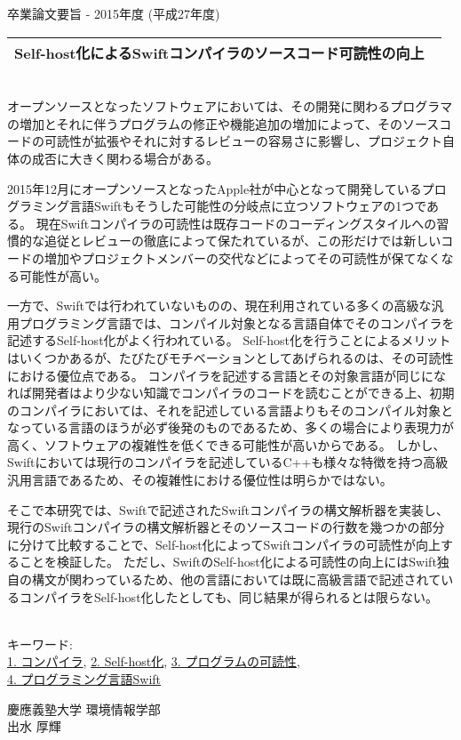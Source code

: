 卒業論文要旨 - 2015年度 (平成27年度)
\begin{center}
\begin{large}
\begin{tabular}{|M{0.97\linewidth}|}
    \hline
    Self-host化によるSwiftコンパイラのソースコード可読性の向上\\
    \hline
\end{tabular}
\end{large}
\end{center}

~ \\

オープンソースとなったソフトウェアにおいては、その開発に関わるプログラマの増加とそれに伴うプログラムの修正や機能追加の増加によって、そのソースコードの可読性が拡張やそれに対するレビューの容易さに影響し、プロジェクト自体の成否に大きく関わる場合がある。

2015年12月にオープンソースとなったApple社が中心となって開発しているプログラミング言語Swiftもそうした可能性の分岐点に立つソフトウェアの1つである。
現在Swiftコンパイラの可読性は既存コードのコーディングスタイルへの習慣的な追従とレビューの徹底によって保たれているが、この形だけでは新しいコードの増加やプロジェクトメンバーの交代などによってその可読性が保てなくなる可能性が高い。

一方で、Swiftでは行われていないものの、現在利用されている多くの高級な汎用プログラミング言語では、コンパイル対象となる言語自体でそのコンパイラを記述するSelf-host化がよく行われている。
Self-host化を行うことによるメリットはいくつかあるが、たびたびモチベーションとしてあげられるのは、その可読性における優位点である。
コンパイラを記述する言語とその対象言語が同じになれば開発者はより少ない知識でコンパイラのコードを読むことができる上、初期のコンパイラにおいては、それを記述している言語よりもそのコンパイル対象となっている言語のほうが必ず後発のものであるため、多くの場合により表現力が高く、ソフトウェアの複雑性を低くできる可能性が高いからである。
しかし、Swiftにおいては現行のコンパイラを記述しているC++も様々な特徴を持つ高級汎用言語であるため、その複雑性における優位性は明らかではない。

そこで本研究では、Swiftで記述されたSwiftコンパイラの構文解析器を実装し、現行のSwiftコンパイラの構文解析器とそのソースコードの行数を幾つかの部分に分けて比較することで、Self-host化によってSwiftコンパイラの可読性が向上することを検証した。
ただし、SwiftのSelf-host化による可読性の向上にはSwift独自の構文が関わっているため、他の言語においては既に高級言語で記述されているコンパイラをSelf-host化したとしても、同じ結果が得られるとは限らない。

~ \\
キーワード:\\
\underline{1. コンパイラ},
\underline{2. Self-host化},
\underline{3. プログラムの可読性},\\
\underline{4. プログラミング言語Swift}
\begin{flushright}
慶應義塾大学 環境情報学部\\
出水 厚輝
\end{flushright}
